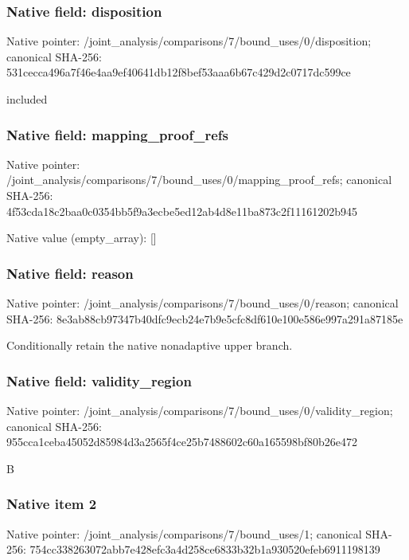 \documentclass[10pt,a4paper]{article}
\begin{document}
\subsubsection{Native field: disposition}
Native pointer: /joint\_\allowbreak{}analysis/comparisons/7/bound\_\allowbreak{}uses/0/disposition; canonical SHA-256: 531cecca496a7f46e4aa9ef40641db12f8bef53aaa6b67c429d2c0717dc599ce

\begingroup\raggedright\sloppy included\par\endgroup

\subsubsection{Native field: mapping\_\allowbreak{}proof\_\allowbreak{}refs}
Native pointer: /joint\_\allowbreak{}analysis/comparisons/7/bound\_\allowbreak{}uses/0/mapping\_\allowbreak{}proof\_\allowbreak{}refs; canonical SHA-256: 4f53cda18c2baa0c0354bb5f9a3ecbe5ed12ab4d8e11ba873c2f11161202b945

Native value (empty\_\allowbreak{}array): []

\subsubsection{Native field: reason}
Native pointer: /joint\_\allowbreak{}analysis/comparisons/7/bound\_\allowbreak{}uses/0/reason; canonical SHA-256: 8e3ab88cb97347b40dfc9ecb24e7b9e5cfc8df610e100e586e997a291a87185e

\begingroup\raggedright\sloppy Conditionally retain the native nonadaptive upper branch.\par\endgroup

\subsubsection{Native field: validity\_\allowbreak{}region}
Native pointer: /joint\_\allowbreak{}analysis/comparisons/7/bound\_\allowbreak{}uses/0/validity\_\allowbreak{}region; canonical SHA-256: 955cca1ceba45052d85984d3a2565f4ce25b7488602c60a165598bf80b26e472

\begingroup\raggedright\sloppy B\par\endgroup

\subsubsection{Native item 2}
Native pointer: /joint\_\allowbreak{}analysis/comparisons/7/bound\_\allowbreak{}uses/1; canonical SHA-256: 754cc338263072abb7e428efc3a4d258ce6833b32b1a930520efeb6911198139
\end{document}
